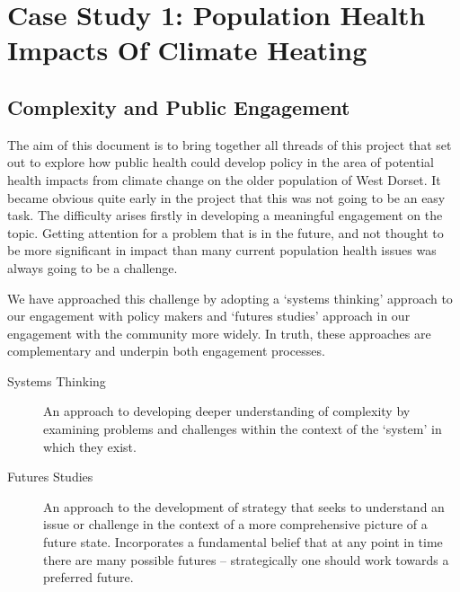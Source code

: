 \chapter{Case Study 1: Population Health Impacts Of Climate Heating}


\section{Complexity and Public Engagement}
The aim of this document is to bring together all threads of this project that set out to explore how public health could develop policy in the area of potential health impacts from climate change on the older population of West Dorset. It became obvious quite early in the project that this was not going to be an easy task. The difficulty arises firstly in developing a meaningful engagement on the topic. Getting attention for a problem that is in the future, and not thought to be more significant in impact than many current population health issues was always going to be a challenge.

We have approached this challenge by adopting a `systems thinking' approach to our engagement with policy makers and `futures studies' approach in our engagement with the community more widely. In truth, these approaches are complementary and underpin both engagement processes.

\begin{description}
	\item[Systems Thinking]An approach to developing deeper understanding of complexity by examining problems and challenges within the context of the `system' in which they exist.
	\item[Futures Studies] An approach to the development of strategy that seeks to understand an issue or challenge in the context of a more comprehensive picture of a future state. Incorporates a fundamental belief that at any point in time there are many possible futures -- strategically one should work towards a preferred future.
\end{description}

